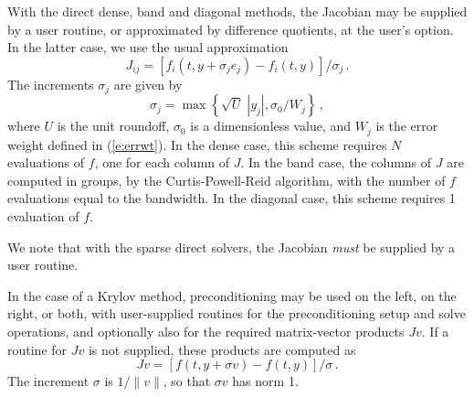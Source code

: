 With the direct dense, band and diagonal methods, the Jacobian may be
supplied by a user routine, or approximated by difference quotients,
at the user's option.  In the latter case, we use the usual
approximation
\[ J_{ij} = [f_i(t,y+\sigma_j e_j) - f_i(t,y)]/\sigma_j \, . \]
The increments $\sigma_j$ are given by
\[ \sigma_j = \max\left\{\sqrt{U} \; |y_j| , \sigma_0 / W_j \right\} \, , \]
where $U$ is the unit roundoff, $\sigma_0$ is a dimensionless value,
and $W_j$ is the error weight defined in (\ref{e:errwt}).  In the dense
case, this scheme requires $N$ evaluations of $f$, one for each column
of $J$.  In the band case, the columns of $J$ are computed in groups,
by the Curtis-Powell-Reid algorithm, with the number of $f$ evaluations
equal to the bandwidth.  In the diagonal case, this scheme requires 1
evaluation of $f$.

We note that with the sparse direct solvers, the Jacobian {\em must}
be supplied by a user routine.

In the case of a Krylov method, preconditioning may be used on the left, on the
right, or both, with user-supplied routines for the preconditioning
setup and solve operations, and optionally also for the required
matrix-vector products $Jv$.  If a routine for $Jv$ is not supplied,
these products are computed as
\begin{equation}\label{jacobv}
Jv = [f(t,y+\sigma v) - f(t,y)]/\sigma \, . 
\end{equation}
The increment $\sigma$ is $1/\|v\|$, so that $\sigma v$ has norm 1.

